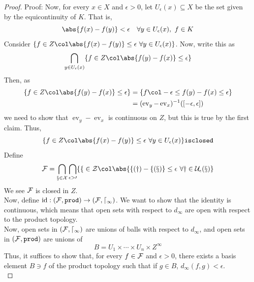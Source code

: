 \begin{proof}{Proof:}
    Now, for every $x \in X$ and $\epsilon > 0$, let $U_{\epsilon}(x) \subseteq X$ be the set given by the equicontinuity of $K$. That is,
    \[ \abs{f(x) - f(y)} < \epsilon \quad \forall y \in U_{\epsilon}(x),\ f \in K \]
    Consider $\{f \in Z \col \abs{f(x) - f(y)} \leq \epsilon \ \forall y \in U_{\epsilon}(x)\}$. Now, write this as
    \[ \bigcap_{y \in U_{\epsilon}(x)} \{f \in Z \col \abs{f(y) - f(x)} \leq \epsilon\} \]
    Then, as
    \begin{align*}
        \{f \in Z \col \abs{f(y) - f(x)} \leq \epsilon\} &= \{f \col -\epsilon \leq f(y) - f(x) \leq \epsilon\}\\
        &= (\operatorname{ev}_y - \operatorname{ev}_x)^{-1}([-\epsilon, \epsilon])
    \end{align*}
    we need to show that $\operatorname{ev}_y - \operatorname{ev}_x$ is continuous on $Z$, but this is true by the first claim. Thus,
    \[ \{f \in Z \col \abs{f(x) - f(y)} \leq \epsilon \ \forall y \in U_{\epsilon}(x)\} \tt{ is closed} \]
    Define
    \[ \cal{F} = \bigcap_{x \in X}\bigcap_{\epsilon > 0} \{f \in Z \col \abs{f(y) - f(x)} \leq \epsilon \ \forall y \in U_{\epsilon}(x)\} \]
    We see $\cal{F}$ is closed in $Z$.\\

    Now, define $\operatorname{id} : (\cal{F}, \tt{prod}) \to (\cal{F}, d_{\infty})$. We want to show that the identity is continuous, which means that open sets with respect to $d_{\infty}$ are open with respect to the product topology.\\

    Now, open sets in $(\cal{F}, d_{\infty})$ are unions of balls with respect to $d_{\infty}$, and open sets in $(\cal{F}, \tt{prod})$ are unions of
    \[ B = U_1 \times \cdots \times U_n \times Z^{\infty} \]
    Thus, it suffices to show that, for every $f \in \cal{F}$ and $\epsilon > 0$, there exists a basis element $B \ni f$ of the product topology such that if $g \in B$, $d_{\infty}(f, g) < \epsilon$.\\


\end{proof}
